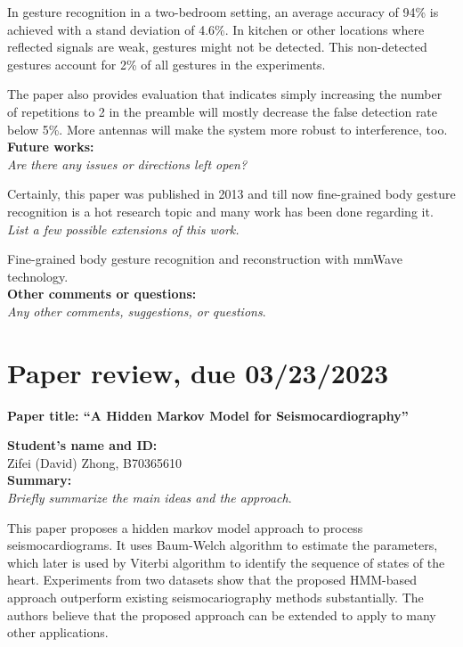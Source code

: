 \documentclass[11pt, oneside]{article}   	%
\begin{document}
In gesture recognition in a two-bedroom setting, an average accuracy of 94\% is achieved with a stand deviation of 4.6\%. In kitchen or other locations where reflected signals are weak, gestures might not be detected. This non-detected gestures account for 2\% of all gestures in the experiments.

The paper also provides evaluation that indicates simply increasing the number of repetitions to 2 in the preamble will mostly decrease the false detection rate below 5\%.  More antennas will make the system more robust to interference, too.\\


\noindent \textbf{Future works:}\\
\emph{Are there any issues or directions left open?}

Certainly, this paper was published in 2013 and till now fine-grained body gesture recognition is a hot research topic and many work has been done regarding it.\\

\noindent \emph{List a few possible extensions of this work.}

Fine-grained body gesture recognition and reconstruction with mmWave technology.\\


\noindent \textbf{Other comments or questions:}\\
\emph{Any other comments, suggestions, or questions}.



\newpage
\section{Paper review, due 03/23/2023}
\begin{center}
\noindent
\textbf{\Large Paper title: ``A Hidden Markov Model for Seismocardiography''}
\end{center}


\noindent \textbf{Student's name and ID: }\\
Zifei (David) Zhong, B70365610\\

\noindent \textbf{Summary:}\\
\emph{Briefly summarize the main ideas and the approach}.

This paper proposes a hidden markov model approach to process seismocardiograms. It uses Baum-Welch algorithm to estimate the parameters, which later is used by Viterbi algorithm to identify the sequence of states of the heart. Experiments from two datasets show that the proposed HMM-based approach outperform existing seismocariography methods substantially. The authors believe that the proposed approach can be extended to apply to many other applications.\\
\end{document}
